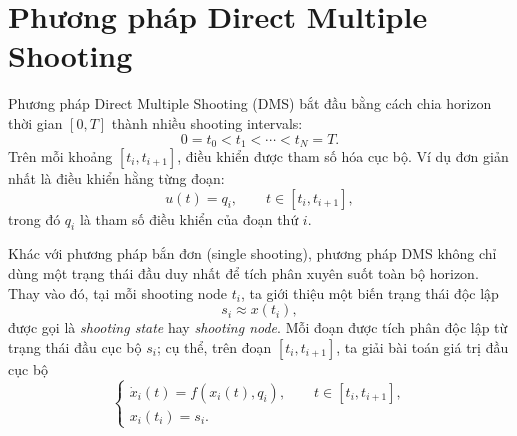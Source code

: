 

\section{Phương pháp Direct Multiple Shooting }
\label{sec:multiple_shooting}

Phương pháp Direct Multiple Shooting  (DMS) bắt đầu bằng cách chia
horizon thời gian $[0,T]$ thành nhiều shooting intervals:
\begin{equation}
0=t_0<t_1<\cdots<t_N=T.
\label{eq:shooting_grid}
\end{equation}
Trên mỗi khoảng $[t_i,t_{i+1}]$, điều khiển được tham số hóa cục bộ.
Ví dụ đơn giản nhất là điều khiển hằng từng đoạn:
\begin{equation}
u(t)=q_i,
\qquad t\in[t_i,t_{i+1}],
\label{eq:piecewise_control_DMS}
\end{equation}
trong đó $q_i$ là tham số điều khiển của đoạn thứ $i$.

Khác với phương pháp bắn đơn (single shooting), phương pháp DMS không chỉ dùng một trạng thái đầu
duy nhất để tích phân xuyên suốt toàn bộ horizon.
Thay vào đó, tại mỗi shooting node $t_i$, ta giới thiệu một biến trạng thái độc lập
\begin{equation}
s_i \approx x(t_i),
\label{eq:shooting_node}
\end{equation}
được gọi là \textit{shooting state} hay \textit{shooting node}.
Mỗi đoạn được tích phân độc lập từ trạng thái đầu cục bộ $s_i$; cụ thể, trên đoạn $[t_i,t_{i+1}]$,
ta giải bài toán giá trị đầu cục bộ
\begin{equation}
\begin{cases}
\dot{x}_i(t)=f(x_i(t),q_i),
\qquad t\in[t_i,t_{i+1}],\\
x_i(t_i)=s_i.
\end{cases}
\label{eq:local_ivp_DMS}
\end{equation}

